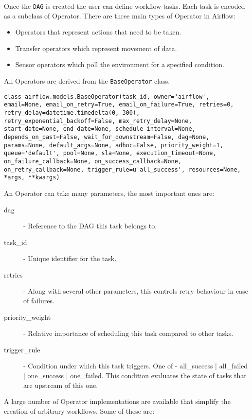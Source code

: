Once the \texttt{DAG} is created the user can define workflow tasks. Each task is encoded as a subclass of Operator. There are three main types of Operator in Airflow:

\begin{itemize}
\item Operators that represent actions that need to be taken.
\item Transfer operators which represent movement of data.
\item Sensor operators which poll the environment for a specified condition.
\end{itemize} 

All Operators are derived from the \texttt{BaseOperator} class.

\begin{verbatim}
class airflow.models.BaseOperator(task_id, owner='airflow', email=None, email_on_retry=True, email_on_failure=True, retries=0, retry_delay=datetime.timedelta(0, 300), retry_exponential_backoff=False, max_retry_delay=None, start_date=None, end_date=None, schedule_interval=None, depends_on_past=False, wait_for_downstream=False, dag=None, params=None, default_args=None, adhoc=False, priority_weight=1, queue='default', pool=None, sla=None, execution_timeout=None, on_failure_callback=None, on_success_callback=None, on_retry_callback=None, trigger_rule=u'all_success', resources=None, *args, **kwargs)
\end{verbatim}

An Operator can take many parameters, the most important ones are:

\begin{description}
\item [dag] - Reference to the DAG this task belongs to.
\item [task\_id] - Unique identifier for the task.
\item [retries] - Along with several other parameters, this controls retry behaviour in case of failures.
\item [priority\_weight] - Relative importance of scheduling this task compared to other tasks.
\item [trigger\_rule] - Condition under which this task triggers. One of - all\_success | all\_failed | one\_success | one\_failed. This condition evaluates the state of tasks that are upstream of this one.
\end{description}

A large number of Operator implementations are available that simplify the creation of arbitrary workflows. Some of these are:

